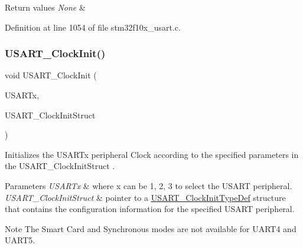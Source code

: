 \begin{DoxyRetVals}{Return values}
{\em None} & \\
\hline
\end{DoxyRetVals}


Definition at line 1054 of file stm32f10x\+\_\+usart.\+c.

\mbox{\label{group___u_s_a_r_t___private___functions_gadb50c7a2175c91acd3728f8eefd0c63d}} 
\subsubsection{\texorpdfstring{U\+S\+A\+R\+T\+\_\+\+Clock\+Init()}{USART\_ClockInit()}}
{\footnotesize\ttfamily void U\+S\+A\+R\+T\+\_\+\+Clock\+Init (\begin{DoxyParamCaption}\item[{\hyperlink{struct_u_s_a_r_t___type_def}{U\+S\+A\+R\+T\+\_\+\+Type\+Def} $\ast$}]{U\+S\+A\+R\+Tx,  }\item[{\hyperlink{struct_u_s_a_r_t___clock_init_type_def}{U\+S\+A\+R\+T\+\_\+\+Clock\+Init\+Type\+Def} $\ast$}]{U\+S\+A\+R\+T\+\_\+\+Clock\+Init\+Struct }\end{DoxyParamCaption})}



Initializes the U\+S\+A\+R\+Tx peripheral Clock according to the specified parameters in the U\+S\+A\+R\+T\+\_\+\+Clock\+Init\+Struct . 


\begin{DoxyParams}{Parameters}
{\em U\+S\+A\+R\+Tx} & where x can be 1, 2, 3 to select the U\+S\+A\+RT peripheral. \\
\hline
{\em U\+S\+A\+R\+T\+\_\+\+Clock\+Init\+Struct} & pointer to a \hyperlink{struct_u_s_a_r_t___clock_init_type_def}{U\+S\+A\+R\+T\+\_\+\+Clock\+Init\+Type\+Def} structure that contains the configuration information for the specified U\+S\+A\+RT peripheral. \\
\hline
\end{DoxyParams}
\begin{DoxyNote}{Note}
The Smart Card and Synchronous modes are not available for U\+A\+R\+T4 and U\+A\+R\+T5. 
\end{DoxyNote}


